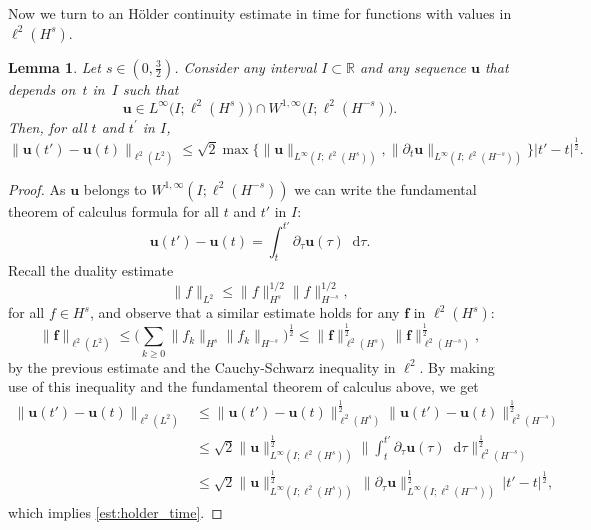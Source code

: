 \documentclass[12pt,a4paper]{amsart}
\newtheorem{lemma}[theorem]{Lemma}
\numberwithin{equation}{section}
\newcommand{\ulu}{\boldsymbol{u}}
\newcommand{\ulf}{\boldsymbol{f}}
\newcommand*\diff{\mathop{}\!\mathrm{d}}
\begin{document}
	Now we turn to an Hölder continuity estimate in time for functions with values in $\ell^2(H^s)$.
	
	\begin{lemma}\label{lem:estimate_holder_t}
		Let $s\in(0,\frac32)$. Consider any interval $ I \subset \mathbb{R} $ and any sequence $\ulu $ that depends on~$t$ in~$I$ such that
		$${\ulu} \in L^\infty\big(I; \ell^2(H^{s})\big) \cap W^{1,\infty} \big(I; \ell^2(H^{-s})\big). $$ Then, for all $t$ and $t^\prime$ in $I$, 
		\begin{equation}\label{est:holder_time}
			\| {\ulu}(t') -  {\ulu}(t) \|_{\ell^2(L^{2})} 
			\leq  \sqrt{2} \max\big\{ \|{\ulu}\|_{L^\infty(I;\ell^2(H^{s}))} , \| \partial_t {\ulu}\|_{L^\infty(I;\ell^2(H^{-s}))} \big\}  |t'-t|^{\frac{1}{2}} .
		\end{equation}
	\end{lemma}
	\begin{proof}
		As $ \ulu$ belongs to $W^{1,\infty}(I;\ell^2(H^{-s})) $ we can write the fundamental theorem of calculus formula for all $t$ and $t'$ in $I$: 
		\begin{equation*}
			\ulu(t') -\ulu(t) = \int_{t}^{t'}  \partial_\tau \ulu (\tau) \diff  \tau  .
		\end{equation*}
		Recall the duality estimate
		\begin{equation*}
			\| f \|_{L^2} \leq \| f \|_{H^{s}}^{1/2} \| f \|_{H^{-s}}^{1/2} ,
		\end{equation*}
		for all $f\in H^s$, and observe that a similar estimate holds for any $ \ulf $ in $\ell^2(H^{s}) $:
		\begin{equation*}
			\| \ulf  \|_{\ell^2(L^2)} \leq \Big( \sum_{k \geq 0}  \| f_k \|_{H^{s}} \| f_k \|_{H^{-s}} \Big)^{\frac{1}{2}} \leq \| \ulf  \|_{\ell^2(H^{s})}^{\frac{1}{2}} \| \ulf  \|_{\ell^2(H^{-s})}^{\frac{1}{2}} ,
		\end{equation*}
		by the previous estimate and the Cauchy-Schwarz inequality in $ \ell^2$. 
		By making use of this inequality and the fundamental theorem of calculus above, we get
		\begin{align*}
			\| \ulu(t')-\ulu(t) \|_{\ell^2(L^2)} &\leq \| \ulu(t')-\ulu(t) \|_{\ell^2(H^{s})}^{\frac{1}{2}} \| \ulu(t')-\ulu(t) \|_{\ell^2(H^{-s})}^{\frac{1}{2}} \\
			&\leq \sqrt{2} \| \ulu \|_{L^{\infty}(I;\ell^2(H^{s}))}^{\frac{1}{2}} \Big\| \int_{t}^{t'}   \partial_\tau \ulu(\tau)\diff  \tau \Big\|_{\ell^2(H^{-s})}^{\frac{1}{2}} \\
			&\leq \sqrt{2} \| \ulu \|_{L^{\infty}(I;\ell^2(H^{s}))}^{\frac{1}{2}} \, \| \partial_{\tau} \ulu \|_{L^{\infty}(I;\ell^2(H^{-s}))}^{\frac{1}{2}} \, |t'-t|^{\frac{1}{2}} ,
		\end{align*}
		which implies \eqref{est:holder_time}.
	\end{proof}
	
\end{document}

